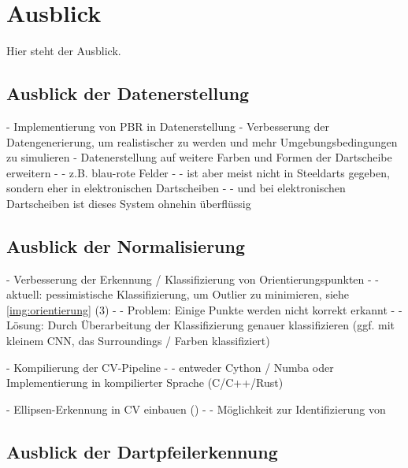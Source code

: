 
\chapter{Ausblick}
\label{cha:ausblick}

Hier steht der Ausblick.


\section{Ausblick der Datenerstellung}
\label{sec:ausblick_data}

- Implementierung von PBR in Datenerstellung
- Verbesserung der Datengenerierung, um realistischer zu werden und mehr Umgebungsbedingungen zu simulieren
- Datenerstellung auf weitere Farben und Formen der Dartscheibe erweitern
- - z.B. blau-rote Felder
- - ist aber meist nicht in Steeldarts gegeben, sondern eher in elektronischen Dartscheiben
- - und bei elektronischen Dartscheiben ist dieses System ohnehin überflüssig


\section{Ausblick der Normalisierung}
\label{sec:ausblick_cv}

- Verbesserung der Erkennung / Klassifizierung von Orientierungspunkten
- - aktuell: pessimistische Klassifizierung, um Outlier zu minimieren, siehe \autoref{img:orientierung} (3)
- - Problem: Einige Punkte werden nicht korrekt erkannt
- - Lösung: Durch Überarbeitung der Klassifizierung genauer klassifizieren (ggf. mit kleinem CNN, das Surroundings / Farben klassifiziert)

- Kompilierung der CV-Pipeline
- - entweder Cython \cite{cython} / Numba \cite{numba} oder Implementierung in kompilierter Sprache (C/C++/Rust)

- Ellipsen-Erkennung in CV einbauen (\cite{ellipse_detection_algorithm})
- - Möglichkeit zur Identifizierung von 


\section{Ausblick der Dartpfeilerkennung}
\label{sec:ausblick_ki}

